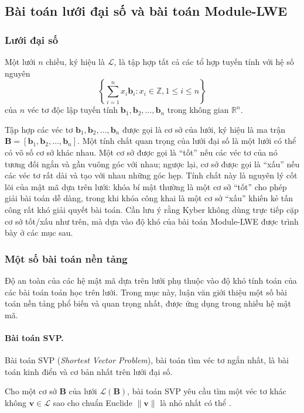 \documentclass[../LuanVan.tex]{subfiles}
\begin{document}
\subsection{Bài toán lưới đại số và bài toán Module-LWE}\label{subsec:lattice}

\subsubsection{Lưới đại số}
\begin{dn}
    Một lưới $n$ chiều, ký hiệu là $\mathcal{L}$, là tập hợp tất cả các tổ hợp tuyến tính với hệ số nguyên
    \begin{equation}
        \left\{\sum_{i=1}^{n} x_i \mathbf{b}_i: x_i \in \mathbb{Z},1\leq i \le n \right\}
    \end{equation}
    của $n$ véc tơ độc lập tuyến tính $\mathbf{b}_1, \mathbf{b}_2, \dots, \mathbf{b}_n$ trong không gian $\mathbb{R}^n$.
\end{dn}

Tập hợp các véc tơ $\mathbf{b}_1, \mathbf{b}_2,\dots ,\mathbf{b}_n$ được gọi là cơ sở của lưới, ký hiệu là ma trận $\mathbf{B} = [\mathbf{b}_1, \mathbf{b}_2, \dots, \mathbf{b}_n]$.
Một tính chất quan trọng của lưới đại số là một lưới có thể có vô số cơ sở khác nhau. Một cơ sở được gọi là ``tốt'' nếu các véc tơ của nó tương đối ngắn và gần vuông góc với nhau; ngược lại, cơ sở được gọi là ``xấu'' nếu các véc tơ rất dài và tạo với nhau những góc hẹp. Tính chất này là nguyên lý cốt lõi của mật mã dựa trên lưới: khóa bí mật thường là một cơ sở ``tốt'' cho phép giải bài toán dễ dàng, trong khi khóa công khai là một cơ sở ``xấu'' khiến kẻ tấn công rất khó giải quyết bài toán.
Cần lưu ý rằng Kyber không dùng trực tiếp cặp cơ sở tốt/xấu như trên, mà dựa vào độ khó của bài toán Module-LWE được trình bày ở các mục sau.

\subsubsection{Một số bài toán nền tảng}
Độ an toàn của các hệ mật mã dựa trên lưới phụ thuộc vào độ khó tính toán của các bài toán toán học trên lưới. Trong mục này, luận văn giới thiệu một số bài toán nền tảng phổ biến và quan trọng nhất, được ứng dụng trong nhiều hệ mật mã.
\paragraph{Bài toán SVP.} Bài toán SVP (\textit{Shortest Vector Problem}), bài toán tìm véc tơ ngắn nhất, là bài toán kinh điển và cơ bản nhất trên lưới đại số.
\begin{bt}
    Cho một cơ sở $\mathbf{B}$ của lưới $\mathcal{L}(\mathbf{B})$, bài toán SVP yêu cầu tìm một véc tơ khác không $\mathbf{v} \in \mathcal{L}$ sao cho chuẩn Euclide $\|\mathbf{v}\|$ là nhỏ nhất có thể \cite{Bergami16}.
\end{bt}
\end{document}
